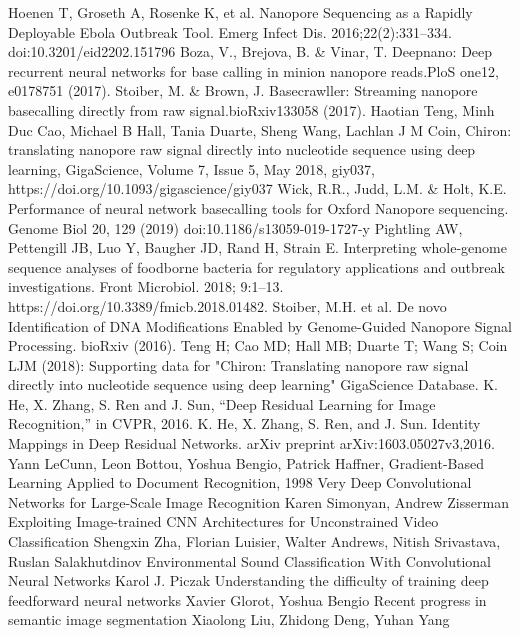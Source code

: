 \documentclass[a4paper,11pt,twoside]{report}
\theoremstyle{definition}
\begin{document}
\begin{thebibliography}{20}
 Hoenen T, Groseth A, Rosenke K, et al. Nanopore Sequencing as a Rapidly Deployable Ebola Outbreak Tool. Emerg Infect Dis. 2016;22(2):331–334. doi:10.3201/eid2202.151796
Boza, V., Brejova, B. \& Vinar, T. Deepnano: Deep recurrent neural networks for base calling in minion nanopore reads.PloS one12, e0178751 (2017).
Stoiber, M. \& Brown, J. Basecrawller: Streaming nanopore basecalling directly from raw signal.bioRxiv133058 (2017).
 Haotian Teng, Minh Duc Cao, Michael B Hall, Tania Duarte, Sheng Wang, Lachlan J M Coin, Chiron: translating nanopore raw signal directly into nucleotide sequence using deep learning, GigaScience, Volume 7, Issue 5, May 2018, giy037, https://doi.org/10.1093/gigascience/giy037
Wick, R.R., Judd, L.M. \& Holt, K.E. Performance of neural network basecalling tools for Oxford Nanopore sequencing. Genome Biol 20, 129 (2019) doi:10.1186/s13059-019-1727-y
Pightling AW, Pettengill JB, Luo Y, Baugher JD, Rand H, Strain E. Interpreting whole-genome sequence analyses of foodborne bacteria for regulatory applications and outbreak investigations. Front Microbiol. 2018; 9:1–13. https://doi.org/10.3389/fmicb.2018.01482.
Stoiber, M.H. et al. De novo Identification of DNA Modifications Enabled by Genome-Guided Nanopore Signal Processing. bioRxiv (2016).
 Teng H; Cao MD; Hall MB; Duarte T; Wang S; Coin LJM (2018): Supporting data for "Chiron: Translating nanopore raw signal directly into nucleotide sequence using deep learning" GigaScience Database.
 K. He, X. Zhang, S. Ren and J. Sun, “Deep Residual Learning for Image Recognition,” in CVPR, 2016.
K. He, X. Zhang, S. Ren, and J. Sun. Identity Mappings in Deep Residual Networks. arXiv preprint arXiv:1603.05027v3,2016.
Yann LeCunn, Leon Bottou, Yoshua Bengio, Patrick Haffner, Gradient-Based Learning Applied to Document Recognition, 1998
Very Deep Convolutional Networks for Large-Scale Image Recognition Karen Simonyan, Andrew Zisserman
 Exploiting Image-trained CNN Architectures for Unconstrained Video Classification Shengxin Zha, Florian Luisier, Walter Andrews, Nitish Srivastava, Ruslan Salakhutdinov
 Environmental Sound Classification With Convolutional Neural Networks Karol J. Piczak
Understanding the difficulty of training deep feedforward neural networks Xavier Glorot, Yoshua Bengio
 Recent progress in semantic image segmentation Xiaolong Liu, Zhidong Deng, Yuhan Yang

\end{thebibliography}
\end{document}
